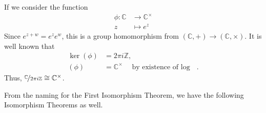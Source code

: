 \begin{example}
    If we consider the function
    \begin{equation*}
    \begin{aligned}
      \phi\colon \mathbb{C} & \longrightarrow \mathbb{C}^\times      \\
      z          & \longmapsto e^z 
    \end{aligned}
    \end{equation*}
    Since \(e^{z + w} = e^z e^w\), this is a group homomorphism from \((\mathbb{C}, +) \to (\mathbb{C}, \times)\). It is well known that
    \begin{align*}
        \ker(\phi) &= 2\pi i \mathbb{Z},\\
        (\phi) &= \mathbb{C}^\times \quad \text{by existence of \(\log\) }.
    \end{align*}
    Thus, \(\nicefrac{\mathbb{C}}{2\pi i \mathbb{Z}} \cong \mathbb{C}^\times\).
\end{example}

From the naming for the First Isomorphism Theorem, we have the following Isomorphism Theorems as well.

